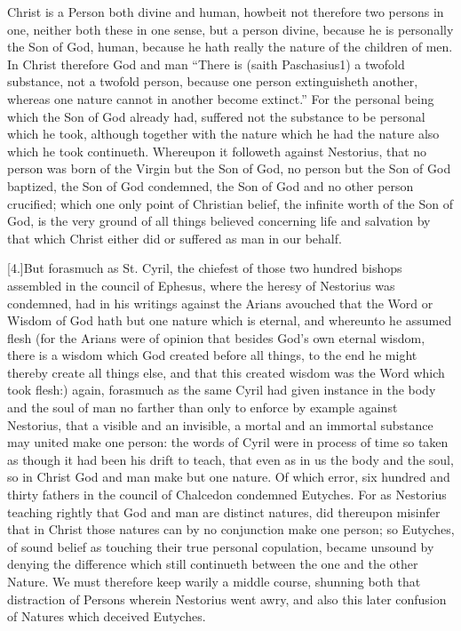 Christ is a Person both divine and human, howbeit not therefore two persons in one, neither both these in one sense, but a person divine, because he is personally the Son of God, human, because he hath really the nature of the children of men. In Christ therefore God and man “There is (saith Paschasius1) a twofold substance, not a twofold person, because one person extinguisheth another, whereas one nature cannot in another become extinct.” For the personal being which the Son of God already had, suffered not the substance  to be personal which he took,
 although together with the nature which he had the nature also which he took continueth. Whereupon it followeth against Nestorius, that no person was born of the Virgin but the Son of God, no person but the Son of God baptized, the Son of God condemned, the Son of God and no other person crucified; which one only point of Christian belief, the infinite worth of the Son of God, is the very ground of all things believed concerning life and salvation by that which Christ either did or suffered as man in our behalf.

[4.]But forasmuch as St. Cyril, the chiefest of those two hundred bishops assembled in the council of Ephesus, where the heresy of Nestorius was condemned, had in his writings against the Arians avouched that the Word or Wisdom of God hath but one nature which is eternal, and whereunto he assumed flesh (for the Arians were of opinion that besides God’s own eternal wisdom, there is a wisdom which God created before all things, to the end he might thereby create all things else, and that this created wisdom was the Word which took flesh:) again, forasmuch as the same Cyril had given instance in the body and the soul of man no farther than only to enforce by example against Nestorius, that a visible and an invisible, a mortal and an immortal substance may united make one person: the words of Cyril were in process of time so taken as though it had been his drift to teach, that even as in us the body and the soul, so in Christ God and man make but one nature. Of which error, six hundred and thirty fathers in the council of Chalcedon condemned Eutyches. For as Nestorius teaching rightly that God and man are distinct natures, did thereupon misinfer that in Christ those natures can by no conjunction make one person; so Eutyches, of sound belief as touching their true personal copulation, became unsound by denying the difference which still continueth between the one and the other Nature. We must therefore keep warily a middle course, shunning both that distraction of Persons wherein Nestorius went awry, and also this later confusion of Natures which deceived Eutyches.



